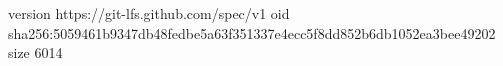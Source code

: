 version https://git-lfs.github.com/spec/v1
oid sha256:5059461b9347db48fedbe5a63f351337e4ecc5f8dd852b6db1052ea3bee49202
size 6014
